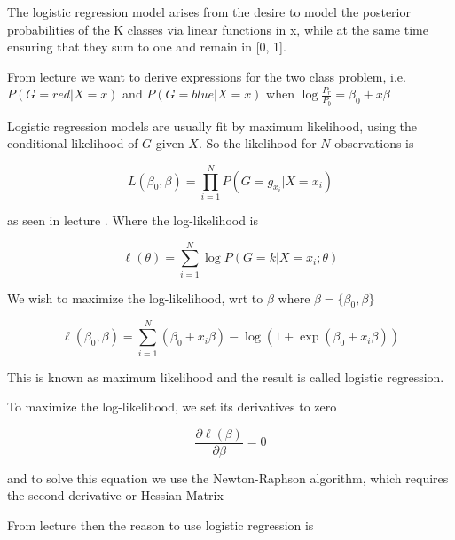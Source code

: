 The logistic regression model arises from the desire to model the posterior probabilities of the K classes via linear functions in x, while at the same time ensuring that they sum to one and remain in [0, 1].

From lecture \cite[p.~21]{lecture4} we want to derive expressions for the two class problem, i.e. $P(G = red | X = x)$ and  $P(G = blue | X = x)$ when $\log \frac{P_r}{P_b} = \beta_0 + x \beta$

Logistic regression models are usually fit by maximum likelihood, using the conditional likelihood of $G$ given $X$. So the likelihood for $N$ observations is

\[
    L ( \beta_0, \beta) = \prod_{i=1}^{N} P(G = g_{x_i} | X = x_i)
\]

as seen in lecture \cite[p.~22]{lecture4}. Where the log-likelihood is

\[
    \ell ( \theta ) = \sum_{i=1}^{N} \log  P(G = k | X = x_i; \theta)
\]

We wish to maximize the log-likelihood, wrt to $\beta$ where $\beta = \{\beta_0, \beta\} $


\[
    \ell (\beta_0, \beta) = \sum_{i=1}^{N} (\beta_0 + x_i \beta) - \log ( 1 + \exp(\beta_0 + x_i \beta))
\]

This is known as maximum likelihood and the result is called logistic regression.

To maximize the log-likelihood, we set its derivatives to zero

\[
    \frac{\partial \ell (\beta)}{\partial \beta}  = 0
\]

and to solve this equation we use the Newton-Raphson algorithm, which requires the second derivative or Hessian Matrix \cite[p.~121]{friedman2016elements}

From lecture \cite[p.~29]{lecture4} then the reason to use logistic regression is

